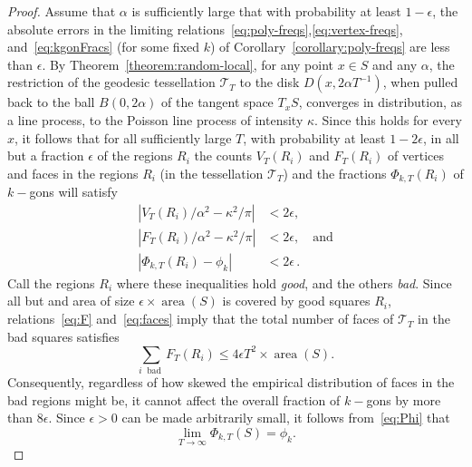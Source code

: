 \documentclass[10pt]{amsart}
\theoremstyle{definition}\newtheorem{defi}[theo]{Definition}\newtheorem{rema}[theo]{Remark}\newtheorem{exam}[theo]{Example}\newtheorem{exem}[theo]{Example}\newtheorem{nota}[theo]{Notation}
\DeclareMathOperator{\area}{area}
\DeclareMathOperator{\bad}{bad}
\begin{document}
\begin{proof}
Assume that $\alpha$ is sufficiently large that with probability at least $1-\epsilon$, the absolute errors in the limiting relations~\eqref{eq:poly-freqs},\eqref{eq:vertex-freqs}, and~\eqref{eq:kgonFracs} (for some fixed $k$) of Corollary~\ref{corollary:poly-freqs} are less than $\epsilon$. By Theorem~\ref{theorem:random-local}, for any point $x\in S$ and any $\alpha$, the restriction of the geodesic tessellation $\mathcal{T}_{T}$ to the disk $D (x,2\alpha T^{-1})$, when pulled back to the ball $B (0,2\alpha)$ of the tangent space $T_x S$, converges in distribution, as a line process, to the Poisson line process of intensity $\kappa$. Since this holds for every $x$, it follows that for all sufficiently large $T$, with probability at least $1-2\epsilon$, in all but a fraction $\epsilon$ of the regions $R_{i} $ the counts $V_{T} (R_{i})$ and $F_{T} (R_{i})$ of vertices and faces in the regions $R_{i}$ (in the tessellation $\mathcal{T}_{T}$) and the fractions $\Phi_{k,T} (R_{i})$ of $k-$gons will satisfy
\begin{align}
|V_{T}(R_{i})/\alpha^{2} - \kappa^{2}/\pi |&<2\epsilon,\label{eq:V}
\\
|F_{T}(R_{i})/\alpha^{2} - \kappa^{2}/\pi |&<2\epsilon, \quad \text{and}\label{eq:F}
\\
|\Phi_{k,T} (R_{i}) -\phi_{k}|&<2\epsilon \label{eq:Phi}
\,.
\end{align}
Call the regions $R_{i} $ where these inequalities hold \emph{good}, and the others \emph{bad}. Since all but and area of size $\epsilon\times \area (S)$ is covered by good squares $R_{i}$, relations~\eqref{eq:F} and~\eqref{eq:faces} imply that the total number of faces of $\mathcal{T}_{T}$ in the bad squares satisfies
\[
\sum_{i \;\bad} F_{T} (R_{i}) \leq 4\epsilon T^{2}\times \area (S).
\]
Consequently, regardless of how skewed the empirical distribution of faces in the bad regions might be, it cannot affect the overall fraction of $k-$gons by more than $8\epsilon $. Since $\epsilon >0$ can be made arbitrarily small, it follows from~\eqref{eq:Phi} that
\begin{equation}\label{eq:Phi-lim}
\lim_{T \rightarrow \infty} \Phi_{k,T} (S)= \phi_{k}.
\end{equation}


\end{proof}
\end{document}
